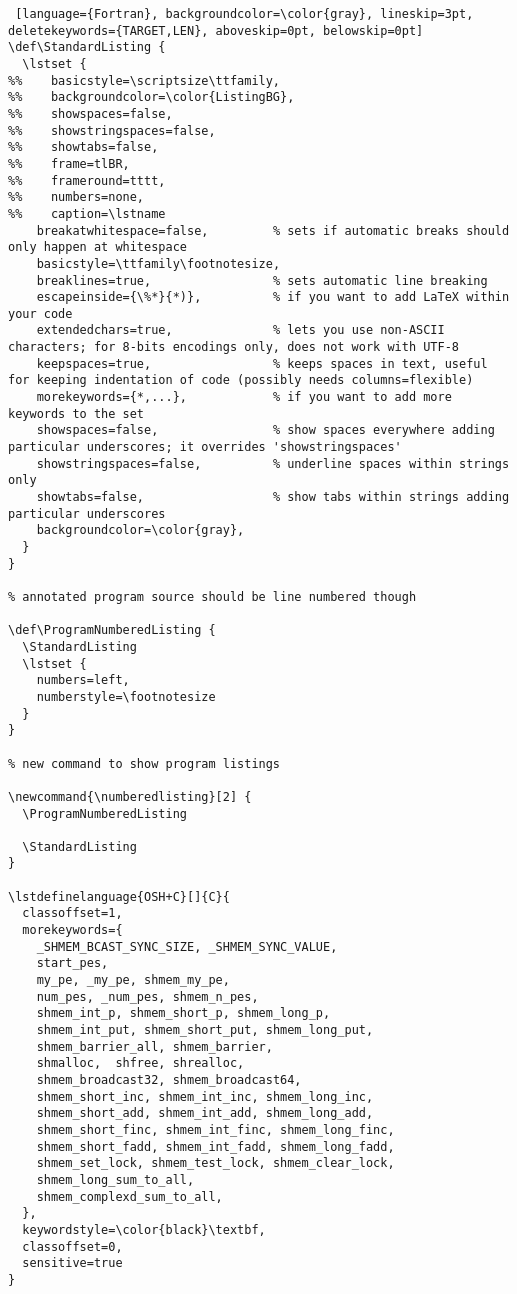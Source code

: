 {\begin{lstlisting} [language={Fortran}, backgroundcolor=\color{gray}, lineskip=3pt, deletekeywords={TARGET,LEN}, aboveskip=0pt, belowskip=0pt]
\def\StandardListing {
  \lstset {
%%    basicstyle=\scriptsize\ttfamily,
%%    backgroundcolor=\color{ListingBG},
%%    showspaces=false,
%%    showstringspaces=false,
%%    showtabs=false,
%%    frame=tlBR,
%%    frameround=tttt,
%%    numbers=none,
%%    caption=\lstname
    breakatwhitespace=false,         % sets if automatic breaks should only happen at whitespace
    basicstyle=\ttfamily\footnotesize,
    breaklines=true,                 % sets automatic line breaking
    escapeinside={\%*}{*)},          % if you want to add LaTeX within your code
    extendedchars=true,              % lets you use non-ASCII characters; for 8-bits encodings only, does not work with UTF-8
    keepspaces=true,                 % keeps spaces in text, useful for keeping indentation of code (possibly needs columns=flexible)
    morekeywords={*,...},            % if you want to add more keywords to the set
    showspaces=false,                % show spaces everywhere adding particular underscores; it overrides 'showstringspaces'
    showstringspaces=false,          % underline spaces within strings only
    showtabs=false,                  % show tabs within strings adding particular underscores
    backgroundcolor=\color{gray}, 
  }
}

% annotated program source should be line numbered though

\def\ProgramNumberedListing {
  \StandardListing
  \lstset {
    numbers=left,
    numberstyle=\footnotesize
  }
}

% new command to show program listings

\newcommand{\numberedlisting}[2] {
  \ProgramNumberedListing
  
  \StandardListing
}

\lstdefinelanguage{OSH+C}[]{C}{
  classoffset=1,
  morekeywords={
    _SHMEM_BCAST_SYNC_SIZE, _SHMEM_SYNC_VALUE,
    start_pes,
    my_pe, _my_pe, shmem_my_pe,
    num_pes, _num_pes, shmem_n_pes,
    shmem_int_p, shmem_short_p, shmem_long_p,
    shmem_int_put, shmem_short_put, shmem_long_put,
    shmem_barrier_all, shmem_barrier,
    shmalloc,  shfree, shrealloc,
    shmem_broadcast32, shmem_broadcast64,
    shmem_short_inc, shmem_int_inc, shmem_long_inc,
    shmem_short_add, shmem_int_add, shmem_long_add,
    shmem_short_finc, shmem_int_finc, shmem_long_finc,
    shmem_short_fadd, shmem_int_fadd, shmem_long_fadd,
    shmem_set_lock, shmem_test_lock, shmem_clear_lock,
    shmem_long_sum_to_all,
    shmem_complexd_sum_to_all,
  },
  keywordstyle=\color{black}\textbf,
  classoffset=0,
  sensitive=true
}


\end{lstlisting}}
